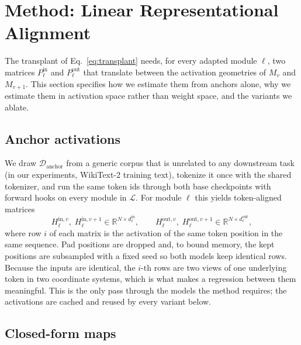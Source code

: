 \section{Method: Linear Representational Alignment}
\label{sec:method}

The transplant of Eq.~\eqref{eq:transplant} needs, for every adapted module
$\ell$, two matrices $P^{\mathrm{in}}_\ell$ and $P^{\mathrm{out}}_\ell$ that
translate between the activation geometries of $M_v$ and $M_{v+1}$. This section
specifies how we estimate them from anchors alone, why we estimate them in
activation space rather than weight space, and the variants we ablate.

\subsection{Anchor activations}
\label{sec:method:anchors}

We draw $\mathcal{D}_{\mathrm{anchor}}$ from a generic corpus that is unrelated
to any downstream task (in our experiments, WikiText-2 training text), tokenize
it once with the shared tokenizer, and run the same token ids through both base
checkpoints with forward hooks on every module in $\mathcal{L}$. For module
$\ell$ this yields token-aligned matrices
\[
  H^{\mathrm{in},v}_\ell,\;H^{\mathrm{in},v+1}_\ell\in\mathbb{R}^{N\times d^{\mathrm{in}}_\ell},
  \qquad
  H^{\mathrm{out},v}_\ell,\;H^{\mathrm{out},v+1}_\ell\in\mathbb{R}^{N\times d^{\mathrm{out}}_\ell},
\]
where row $i$ of each matrix is the activation of the same token position in
the same sequence. Pad positions are dropped and, to bound memory, the kept
positions are subsampled with a fixed seed so both models keep identical rows.
Because the inputs are identical, the $i$-th rows are two views of one
underlying token in two coordinate systems, which is what makes a regression
between them meaningful. This is the only pass through the models the method
requires; the activations are cached and reused by every variant below.

\subsection{Closed-form maps}
\label{sec:method:maps}

